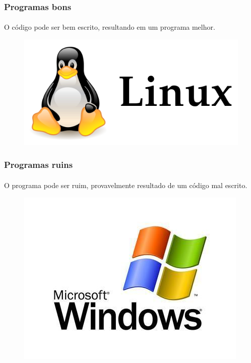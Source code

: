 \documentclass{beamer}
\begin{document}
\begin{frame}
  \frametitle{Programas bons}
  \framesubtitle{}

  O código pode ser bem escrito, resultando em um programa melhor.
  \begin{figure}
    \begin{center}
      \includegraphics[height=.5\textheight]{images/linux.png}
    \end{center}
  \end{figure}
\end{frame}

\begin{frame}
  \frametitle{Programas ruins}
  \framesubtitle{}

  O programa pode ser ruim, provavelmente resultado de um código mal escrito.
  \begin{figure}
    \begin{center}
      \includegraphics[height=.5\textheight]{images/windows.jpg}
    \end{center}
  \end{figure}
\end{frame}
\end{document}
